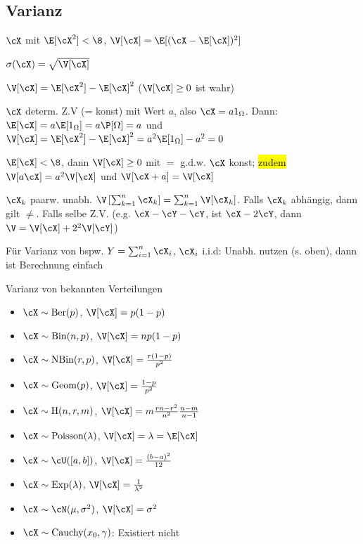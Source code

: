\subsection{Varianz}
\shortdefinition $\cX$ mit $\E[\cX^2] < \8$, $\V[\cX] = \E[(\cX - \E[\cX])^2]$

\shortdefinition[Standardabweichung] $\sigma(\cX) = \sqrt{\V[\cX]}$

\shortremark $\V[\cX] = \E[\cX^2] - \E[\cX]^2$ ($\V[\cX] \geq 0$ ist wahr)

\shortexample $\cX$ determ. Z.V (= konst) mit Wert $a$, also $\cX = a1_\Omega$. Dann: $\E[\cX] = a \E[1_\Omega] = a \P[\Omega] = a$ und\\
$\V[\cX] = \E[\cX^2] - \E[\cX]^2 = a^2\E[1_\Omega] - a^2 = 0$

\shortremark $\E[\cX] < \8$, dann $\V[\cX] \geq 0$ mit $=$ g.d.w. $\cX$ konst; \hl{zudem} $\V[a \cX] = a^2 \V[\cX]$ und $\V[\cX + a] = \V[\cX]$

\shortproposition $\cX_k$ paarw. unabh. $\V\left[ \sum_{k = 1}^{n} \cX_k \right] = \sum_{k = 1}^{n} \V[\cX_k]$.
Falls $\cX_k$ abhängig, dann gilt $\neq$.
Falls  selbe Z.V. (e.g. $\cX - \cY - \cY$, ist $\cX - 2\cY$, dann $\V = \V[\cX] + 2^2 \V[\cY]$)

\shortremark Für Varianz von bspw. $Y = \sum_{i = 1}^{n} \cX_i$, $\cX_i$ i.i.d: Unabh. nutzen (s. oben), dann ist Berechnung einfach

\shortexample Varianz von bekannten Verteilungen
\begin{itemize}
    \item $\cX \sim \text{Ber}(p)$, $\V[\cX] = p (1 - p)$
    \item $\cX \sim \text{Bin}(n, p)$, $\V[\cX] = n p (1 - p)$
    \item $\cX \sim \text{NBin}(r, p)$, $\V[\cX] = \frac{r(1 - p)}{p^2}$
    \item $\cX \sim \text{Geom}(p)$, $\V[\cX] = \frac{1 - p}{p^2}$
    \item $\cX \sim \text{H}(n, r, m)$, $\V[\cX] = m\frac{rn - r^2}{n^2} \frac{n - m}{n - 1}$
    \item $\cX \sim \text{Poisson}(\lambda)$, $\V[\cX] = \lambda = \E[\cX]$
    \item $\cX \sim \cU([a, b])$, $\V[\cX] = \frac{(b - a)^2}{12}$
    \item $\cX \sim \text{Exp}(\lambda)$, $\V[\cX] = \frac{1}{\lambda^2}$
    \item $\cX \sim \cN(\mu, \sigma^2)$, $\V[\cX] = \sigma^2$
    \item $\cX \sim \text{Cauchy}(x_0, \gamma)$: Existiert nicht
\end{itemize}
